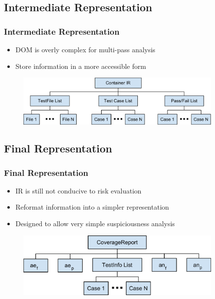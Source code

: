 \documentclass{beamer}
\begin{document}
	\subsection{Intermediate Representation}
	\begin{frame}
	\frametitle{Intermediate Representation}
	\begin{itemize}
		\item DOM is overly complex for multi-pass analysis\
		\pause
		\item Store information in a more accessible form
		\pause
	\end{itemize}
	
	\begin{figure}
		\label{ir}
		\includegraphics[width=4in]{img/ContainerIR.pdf}
	\end{figure}
	
	\end{frame}
	\subsection{Final Representation}
	\begin{frame}
	\frametitle{Final Representation}
	\begin{itemize}
		\item IR is still not conducive to risk evaluation
		\pause
		\item Reformat information into a simpler representation
		\pause
		\item Designed to allow very simple suspiciousness analysis
		\pause
	\end{itemize}
	
	\begin{figure}
		\label{sr}
		\includegraphics[width=4in]{img/CoverageReport.pdf}
	\end{figure}
	\end{frame}
\end{document}
